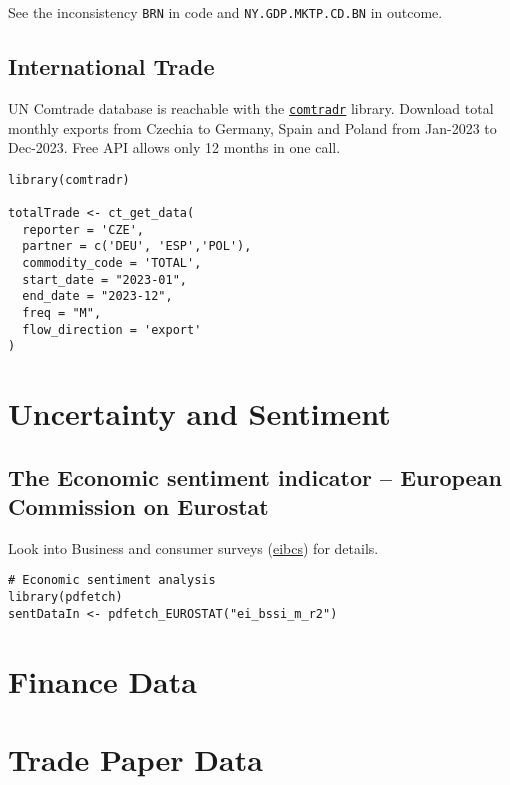 \documentclass[10pt,a4paper]{article}
\begin{document}
See the inconsistency \texttt{BRN} in code and  \texttt{NY.GDP.MKTP.CD.BN} in outcome.

\subsection*{International Trade}
UN Comtrade database is reachable with the \href{https://cran.r-project.org/web/packages/comtradr/index.html}{\texttt{\textcolor{NavyBlue}{comtradr}}} library. Download total monthly exports from Czechia to Germany, Spain and Poland from Jan-2023 to Dec-2023. Free API allows only 12 months in one call.

\begin{lstlisting}
library(comtradr)

totalTrade <- ct_get_data(
  reporter = 'CZE',
  partner = c('DEU', 'ESP','POL'),
  commodity_code = 'TOTAL',
  start_date = "2023-01",
  end_date = "2023-12",
  freq = "M",
  flow_direction = 'export'
)
\end{lstlisting}


\section*{Uncertainty and Sentiment}

\subsection*{The Economic sentiment indicator -- European Commission on Eurostat}
Look into Business and consumer surveys (\href{https://ec.europa.eu/eurostat/cache/metadata/en/ei\_bcs\_esms.htm}{\textcolor{NavyBlue}{eibcs}}) for details.

\begin{lstlisting}
# Economic sentiment analysis
library(pdfetch)
sentDataIn <- pdfetch_EUROSTAT("ei_bssi_m_r2")
\end{lstlisting}

\section*{Finance Data}
\section*{Trade Paper Data}
\end{document}
